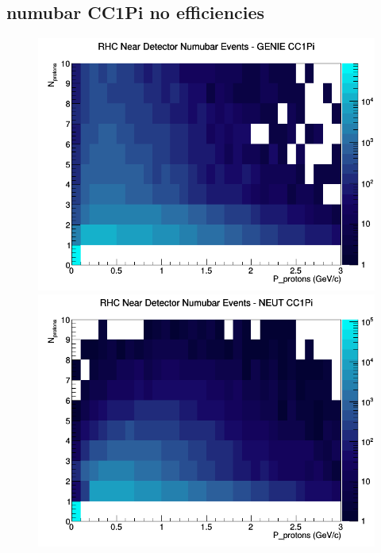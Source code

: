 \subsection{numubar CC1Pi no efficiencies}
\begin{figure}[h]
\includegraphics[width=\linewidth]{N_P/nominal/protons/CC1Pi_RHC_ND_numubar_N_P_GENIE.png}
\endminipage
{}
\includegraphics[width=\linewidth]{N_P/nominal/protons/CC1Pi_RHC_ND_numubar_N_P_NEUT.png}
\endminipage
{}

\end{figure}

